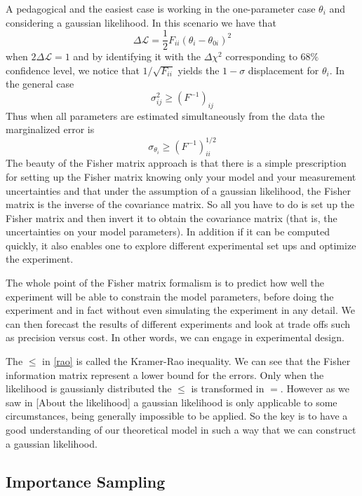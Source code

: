 \documentclass[onecolumn,           %
               showpacs,            %
               preprintnumbers,     %
               aps,                 %
               prl,          	    %
               letterpaper,             %
               superscriptaddress,      %
               nofootinbib,         %
               tightenlines,        %
               floats,floatfix      %
               ,usenatbib,
               ]{revtex4-1}
\begin{document}
A pedagogical and the easiest case is working in the one-parameter case $\theta_i$ and considering a gaussian likelihood. In this scenario we have that
\begin{equation}
\Delta \mathcal{L}=\frac{1}{2}F_{ii}(\theta_i- \theta_{0i})^2
\end{equation}
when $2\Delta\mathcal{L}=1$ and by identifying it with the $\Delta \chi^2$ corresponding to $68\%$ confidence level, we notice that $1/\sqrt{F_{ii}}$ yields the $1-\sigma$ displacement for $\theta_i$. In the general case
\begin{equation}\label{rao}
\sigma_{ij}^2 \geq (F^{-1})_{ij}
\end{equation}
Thus when all parameters are estimated simultaneously from the data the marginalized error is
\begin{equation}
\sigma_{\theta_i}\geq (F^{-1})^{1/2}_{ii}
\end{equation}
The beauty of the Fisher matrix approach is that there is a simple prescription for setting up the Fisher matrix knowing only your model and your measurement uncertainties and that
under the assumption of a gaussian likelihood, the Fisher matrix is the inverse of the covariance matrix. So all you have to do is set up the Fisher matrix and then invert it to obtain the covariance matrix (that is, the uncertainties on your model parameters). In addition if it can be computed quickly, it also enables one to explore different experimental set ups and optimize the experiment.

The whole point of the Fisher matrix formalism is to predict how well the experiment will be able to constrain the model parameters, before doing the experiment and in fact without even simulating the experiment in any detail. We can then forecast the results of different experiments and look at trade offs such as precision versus cost. In other words, we can engage in experimental design.

The $\leq$ in \eqref{rao} is called the Kramer-Rao inequality. We can see that the Fisher information matrix represent a lower bound for the errors. Only when the likelihood is gaussianly distributed the $\leq$ is transformed in $=$. However as we saw in [About the likelihood] a gaussian likelihood is only applicable to some circumstances, being generally impossible to be applied. So the key is to  have a good understanding of our theoretical model in such a way that we can construct a gaussian likelihood.

\subsection{Importance Sampling}
\end{document}
